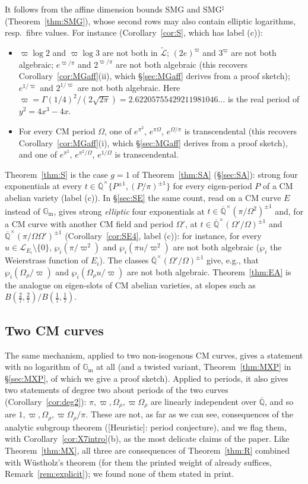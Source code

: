 \documentclass[11pt]{amsart}
\theoremstyle{definition}
\newcommand{\Qb}{\overline{\mathbb{Q}}}
\newcommand{\Gm}{\mathbb{G}_{\mathrm m}}
\newcommand{\Lg}{\mathcal{L}}
\newcommand{\Lt}{\widetilde{\mathcal{L}}}
\newcommand{\vp}{\varpi}
\newcommand{\lab}[1]{\textup{[#1]}}
\begin{document}
It follows from the affine dimension bounds SMG
and SMG$^\natural$ (Theorem~\ref{thm:SMG}), whose second rows may also contain elliptic logarithms, resp.\ fibre values.
For instance (Corollary~\ref{cor:S}, which has label (c)):
\begin{itemize}
\item $\vp\log2$ and $\vp\log3$ are not both in $\Lt$; $(2e)^{\vp}$ and $3^{\vp}$ are not both algebraic;
$e^{\vp/\pi}$ and $2^{\vp/\pi}$ are not both algebraic (this recovers Corollary~\ref{cor:MGaff}(ii), which
\S\ref{sec:MGaff} derives from a proof sketch);
$e^{1/\vp}$ and $2^{1/\vp}$ are not both algebraic. Here $\vp=\Gamma(1/4)^2/(2\sqrt{2\pi})=2.62205755429211981046\ldots$
is the real period of $y^2=4x^3-4x$.
\item For every CM period $\Omega$, one of $e^{\pi^2}$, $e^{\pi\Omega}$, $e^{\Omega/\pi}$ is transcendental (this recovers
Corollary~\ref{cor:MGaff}(i), which \S\ref{sec:MGaff} derives from a proof sketch), and one of $e^{\pi^2}$, $e^{\pi^2/\Omega}$,
$e^{1/\Omega}$ is transcendental.
\end{itemize}
Theorem~\ref{thm:S} is the case $g=1$ of Theorem~\ref{thm:SA} (\S\ref{sec:SA}): strong four exponentials at every
$t\in\Qb^\times\{P^{\pm1},(P/\pi)^{\pm1}\}$ for every eigen-period $P$ of a CM abelian variety (label (c)). In
\S\ref{sec:SE} the same count, read on a CM curve $E$ instead of $\Gm$, gives strong \emph{elliptic} four exponentials at
$t\in\Qb^\times(\pi/\Omega^2)^{\pm1}$ and, for a CM curve with another CM field and period $\Omega'$, at
$t\in\Qb^\times(\Omega'/\Omega)^{\pm1}$ and $\Qb^\times(\pi/\Omega\Omega')^{\pm1}$ (Corollary~\ref{cor:SE4}, label (c)): for
instance, for every $u\in\Lg_{E_i}\setminus\{0\}$, $\wp_i(\pi/\vp^2)$ and $\wp_i(\pi u/\vp^2)$ are not both algebraic
($\wp_i$ the Weierstrass function of $E_i$). The classes $\Qb^\times(\Omega'/\Omega)^{\pm1}$ give, e.g., that $\wp_i(\Omega_\rho/\vp)$ and
$\wp_i(\Omega_\rho u/\vp)$ are not both algebraic. Theorem~\ref{thm:EA}
is the analogue on eigen-slots of CM abelian varieties, at slopes such as $B(\frac27,\frac27)/B(\frac17,\frac17)$.
\subsection*{Two CM curves}
The same mechanism, applied to two non-isogenous CM curves, gives a statement with no logarithm of $\Gm$ at all (and
a twisted variant, Theorem~\ref{thm:MXP} in \S\ref{sec:MXP}, of which we give a proof sketch). Applied to periods, it also
gives two statements of degree two about periods of the two curves (Corollary~\ref{cor:deg2}): $\pi,\vp,\Omega_\rho,\vp\Omega_\rho$
are linearly independent over $\Qb$, and so are $1,\vp,\Omega_\rho,\vp\Omega_\rho/\pi$. These are not, as far as we can
see, consequences of the analytic subgroup theorem (\lab{Heuristic}: period conjecture), and we flag them, with
Corollary~\ref{cor:X7intro}(b), as the most delicate claims of the paper. Like Theorem~\ref{thm:MX}, all three are
consequences of Theorem~\ref{thm:R} combined with W\"ustholz's theorem (for them the printed weight of \cite{RW93} already
suffices, Remark~\ref{rem:explicit}); we found none of them stated in print.
\end{document}
